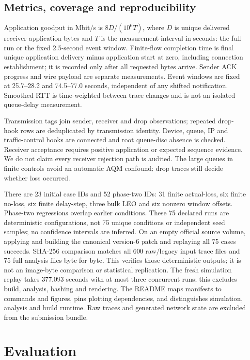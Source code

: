 \documentclass[conference]{IEEEtran}
\begin{document}
\subsection{Metrics, coverage and reproducibility}
Application goodput in Mbit/s is $8D/(10^6T)$, where $D$ is unique
delivered receiver application bytes and $T$ is the measurement interval
in seconds: the full run or the fixed 2.5-second event window.
Finite-flow completion time is final
unique application delivery minus application start at zero, including
connection establishment; it is recorded only after all requested bytes
arrive. Sender ACK progress and wire payload are separate measurements.
Event windows are fixed at 25.7--28.2 and 74.5--77.0 seconds, independent
of any shifted notification. Smoothed RTT is time-weighted between trace
changes and is not an isolated queue-delay measurement.

Transmission tags join sender, receiver and drop observations; repeated
drop-hook rows are deduplicated by transmission identity. Device, queue,
IP and traffic-control hooks are connected and root queue-disc absence
is checked. Receiver acceptance requires positive application or expected
sequence evidence. We do not claim every receiver rejection path is
audited. The large queues in finite controls avoid an automatic AQM
confound; drop traces still decide whether loss occurred.

There are 23 initial case IDs and 52 phase-two IDs: 31 finite actual-loss,
six finite no-loss, six finite delay-step, three bulk LEO and six nonzero
window offsets. Phase-two regressions overlap earlier conditions.
These 75 declared runs are deterministic configurations, not 75 unique
conditions or independent seed samples; no confidence intervals are
inferred. On an empty official source volume, applying and building
the canonical version-6 patch and replaying all 75 cases succeeds.
SHA-256 comparison matches all 600 raw/legacy input trace files and
75 full analysis files byte for byte. This verifies those deterministic
outputs; it is not an image-byte comparison or statistical replication.
The fresh simulation replay takes 377.093 seconds with at most three
concurrent runs; this excludes build, analysis, hashing and rendering.
The README maps manifests to commands and figures, pins plotting
dependencies, and distinguishes simulation, analysis and build runtime.
Raw traces and generated network state are excluded from the submission
bundle.

\section{Evaluation}
\end{document}
